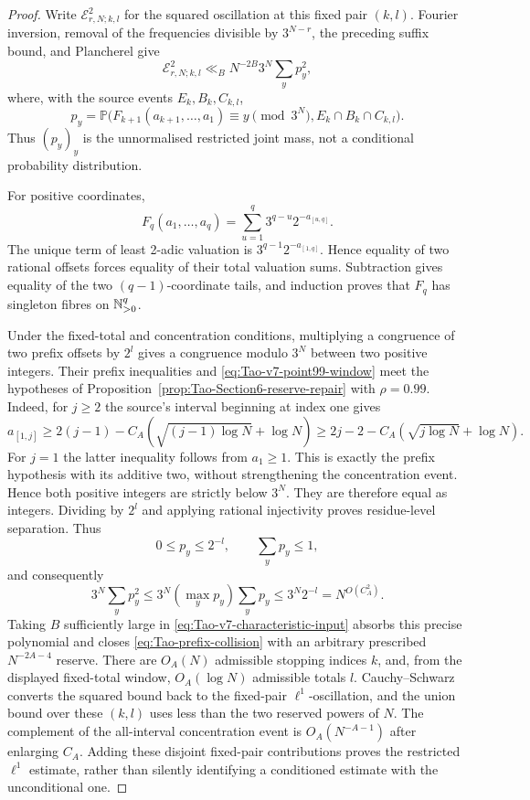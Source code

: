 \begin{proof}
Write \(\mathcal E_{r,N;k,l}^2\) for the squared oscillation at this fixed
pair \((k,l)\).  Fourier inversion, removal of the frequencies divisible by
\(3^{N-r}\), the preceding suffix bound, and Plancherel give
\begin{equation}
\label{eq:Tao-prefix-collision}
 \mathcal E_{r,N;k,l}^2\ll_B N^{-2B}3^N\sum_y p_y^2,
\end{equation}
where, with the source events \(E_k,B_k,C_{k,l}\),
\[
 p_y=\mathbb P\bigl(
 F_{k+1}(a_{k+1},\ldots,a_1)\equiv y\pmod{3^N},
 E_k\cap B_k\cap C_{k,l}\bigr).
\]
Thus \((p_y)_y\) is the unnormalised restricted joint mass, not a
conditional probability distribution.

For positive coordinates,
\[
 F_q(a_1,\ldots,a_q)
 =\sum_{u=1}^q3^{q-u}2^{-a_{[u,q]}}.
\]
The unique term of least 2-adic valuation is
\(3^{q-1}2^{-a_{[1,q]}}\).  Hence equality of two rational offsets forces
equality of their total valuation sums.  Subtraction gives equality of the
two \((q-1)\)-coordinate tails, and induction proves that \(F_q\) has
singleton fibres on \(\mathbb{N}_{>0}^q\).

Under the fixed-total and concentration conditions, multiplying a congruence
of two prefix offsets by \(2^l\) gives a congruence modulo \(3^N\) between
two positive integers.  Their prefix inequalities and
\eqref{eq:Tao-v7-point99-window} meet the hypotheses of
Proposition~\ref{prop:Tao-Section6-reserve-repair} with \(\rho=0.99\).
Indeed, for \(j\ge2\) the source's interval beginning at index one gives
\[
 a_{[1,j]}\ge2(j-1)-C_A(\sqrt{(j-1)\log N}+\log N)
 \ge2j-2-C_A(\sqrt{j\log N}+\log N).
\]
For \(j=1\) the latter inequality follows from \(a_1\ge1\).
This is exactly the prefix hypothesis with its additive two, without
strengthening the concentration event.
Hence both positive integers are strictly below \(3^N\).  They are therefore
equal as integers.  Dividing by \(2^l\) and applying rational injectivity
proves residue-level separation.
Thus
\[
 0\le p_y\le2^{-l},\qquad \sum_y p_y\le1,
\]
and consequently
\[
 3^N\sum_yp_y^2\le3^N(\max_yp_y)\sum_yp_y
 \le3^N2^{-l}=N^{O(C_A^2)}.
\]
Taking \(B\) sufficiently large in
\eqref{eq:Tao-v7-characteristic-input} absorbs this precise polynomial and
closes \eqref{eq:Tao-prefix-collision} with an arbitrary prescribed
\(N^{-2A-4}\) reserve.  There are \(O_A(N)\) admissible stopping indices
\(k\), and, from the displayed fixed-total window, \(O_A(\log N)\)
admissible totals \(l\).  Cauchy--Schwarz converts the squared bound back to
the fixed-pair \(\ell^1\)-oscillation, and the union bound over these
\((k,l)\) uses less than the two reserved powers of \(N\).  The complement
of the all-interval concentration event is \(O_A(N^{-A-1})\) after enlarging
\(C_A\).  Adding these disjoint fixed-pair contributions proves the
restricted \(\ell^1\) estimate, rather than silently identifying a
conditioned estimate with the unconditional one.


\end{proof}
